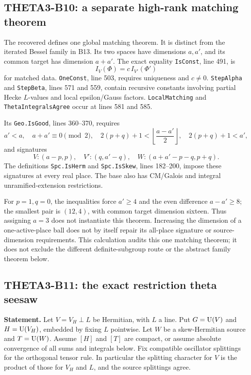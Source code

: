 \documentclass[11pt]{article}
\theoremstyle{definition}\newtheorem{definition}[theorem]{Definition}\newtheorem{remark}[theorem]{Remark}
\begin{document}
\subsection{THETA3-B10: a separate high-rank matching theorem}\label{B10}

The recovered  defines one global matching theorem. It is distinct from the iterated Bessel family in B13. Its two spaces have dimensions $a,a'$, and its common target has dimension $a+a'$. The exact equality \texttt{IsConst}, line 491, is
\[
 I_V(\Phi)=c\,I_{V'}(\Phi')
\]
for matched data. \texttt{OneConst}, line 503, requires uniqueness and $c\ne0$. \texttt{StepAlpha} and \texttt{StepBeta}, lines 571 and 559, contain recursive constants involving partial Hecke $L$-values and local epsilon/Gauss factors. \texttt{LocalMatching} and \texttt{ThetaIntegralsAgree} occur at lines 581 and 585.

Its \texttt{Geo.IsGood}, lines 360--370, requires
\[
 a'<a,\quad a+a'\equiv0\pmod2,\quad
 2(p+q)+1<\left\lfloor\frac{a-a'}2\right\rfloor,\quad
 2(p+q)+1<a',
\]
and signatures
\[
 V:(a-p,p),\quad V':(q,a'-q),\quad
 W:(a+a'-p-q,p+q).
\]
The definitions \texttt{Spc.IsHerm} and \texttt{Spc.IsSkew}, lines 182--200, impose these signatures at every real place. The base also has CM/Galois and integral unramified-extension restrictions.

For $p=1,q=0$, the inequalities force $a'\geq4$ and the even difference $a-a'\geq8$; the smallest pair is $(12,4)$, with common target dimension sixteen. Thus assigning $a=3$ does not instantiate this theorem. Increasing the dimension of a one-active-place ball does not by itself repair its all-place signature or source-dimension requirements. This calculation audits this one matching theorem; it does not exclude the different definite-subgroup route or the abstract family theorem below.

\subsection{THETA3-B11: the exact restriction theta seesaw}\label{B11}

\textbf{Statement.} Let $V=V_H\perp L$ be Hermitian, with $L$ a line. Put $G=\operatorname{U}(V)$ and $H=\operatorname{U}(V_H)$, embedded by fixing $L$ pointwise. Let $W$ be a skew-Hermitian source and $T=\operatorname{U}(W)$. Assume $[H]$ and $[T]$ are compact, or assume absolute convergence of all sums and integrals below. Fix compatible oscillator splittings for the orthogonal tensor rule. In particular the splitting character for $V$ is the product of those for $V_H$ and $L$, and the source splittings agree.
\end{document}
